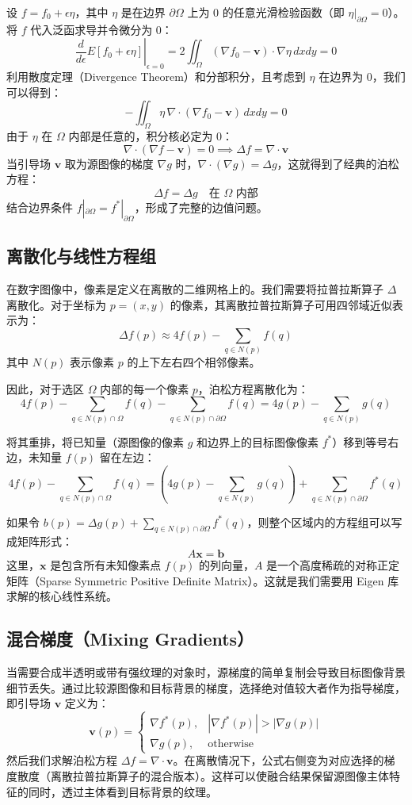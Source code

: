 \documentclass[12pt,a4paper]{ctexart}
\begin{document}
设 $f = f_0 + \epsilon \eta$，其中 $\eta$ 是在边界 $\partial\Omega$ 上为 0 的任意光滑检验函数（即 $\eta|_{\partial\Omega} = 0$）。
将 $f$ 代入泛函求导并令微分为 0：
$$ \left. \frac{d}{d\epsilon} E[f_0 + \epsilon \eta] \right|_{\epsilon=0} = 2 \iint_{\Omega} (\nabla f_0 - \mathbf{v}) \cdot \nabla \eta \, dx dy = 0 $$
利用散度定理（Divergence Theorem）和分部积分，且考虑到 $\eta$ 在边界为 0，我们可以得到：
$$ - \iint_{\Omega} \eta \, \nabla \cdot (\nabla f_0 - \mathbf{v}) \, dx dy = 0 $$
由于 $\eta$ 在 $\Omega$ 内部是任意的，积分核必定为 0：
$$ \nabla \cdot (\nabla f - \mathbf{v}) = 0 \implies \Delta f = \nabla \cdot \mathbf{v} $$
当引导场 $\mathbf{v}$ 取为源图像的梯度 $\nabla g$ 时，$\nabla \cdot (\nabla g) = \Delta g$，这就得到了经典的泊松方程：
$$ \Delta f = \Delta g \quad \text{在 } \Omega \text{ 内部} $$
结合边界条件 $f|_{\partial\Omega} = f^*|_{\partial\Omega}$，形成了完整的边值问题。

\subsection{离散化与线性方程组}
在数字图像中，像素是定义在离散的二维网格上的。我们需要将拉普拉斯算子 $\Delta$ 离散化。对于坐标为 $p = (x, y)$ 的像素，其离散拉普拉斯算子可用四邻域近似表示为：
$$ \Delta f(p) \approx 4f(p) - \sum_{q \in N(p)} f(q) $$
其中 $N(p)$ 表示像素 $p$ 的上下左右四个相邻像素。

因此，对于选区 $\Omega$ 内部的每一个像素 $p$，泊松方程离散化为：
$$ 4f(p) - \sum_{q \in N(p) \cap \Omega} f(q) - \sum_{q \in N(p) \cap \partial\Omega} f(q) = 4g(p) - \sum_{q \in N(p)} g(q) $$

将其重排，将已知量（源图像的像素 $g$ 和边界上的目标图像像素 $f^*$）移到等号右边，未知量 $f(p)$ 留在左边：
$$ 4f(p) - \sum_{q \in N(p) \cap \Omega} f(q) = \left( 4g(p) - \sum_{q \in N(p)} g(q) \right) + \sum_{q \in N(p) \cap \partial\Omega} f^*(q) $$

如果令 $b(p) = \Delta g(p) + \sum_{q \in N(p) \cap \partial\Omega} f^*(q)$，则整个区域内的方程组可以写成矩阵形式：
$$ A \mathbf{x} = \mathbf{b} $$
这里，$\mathbf{x}$ 是包含所有未知像素点 $f(p)$ 的列向量，$A$ 是一个高度稀疏的对称正定矩阵（Sparse Symmetric Positive Definite Matrix）。这就是我们需要用 Eigen 库求解的核心线性系统。

\subsection{混合梯度（Mixing Gradients）}
当需要合成半透明或带有强纹理的对象时，源梯度的简单复制会导致目标图像背景细节丢失。通过比较源图像和目标背景的梯度，选择绝对值较大者作为指导梯度，即引导场 $\mathbf{v}$ 定义为：
$$ \mathbf{v}(p) = \begin{cases} 
      \nabla f^*(p), & |\nabla f^*(p)| > |\nabla g(p)| \\
      \nabla g(p), & \text{otherwise} 
   \end{cases} $$
然后我们求解泊松方程 $\Delta f = \nabla \cdot \mathbf{v}$。在离散情况下，公式右侧变为对应选择的梯度散度（离散拉普拉斯算子的混合版本）。这样可以使融合结果保留源图像主体特征的同时，透过主体看到目标背景的纹理。
\end{document}
